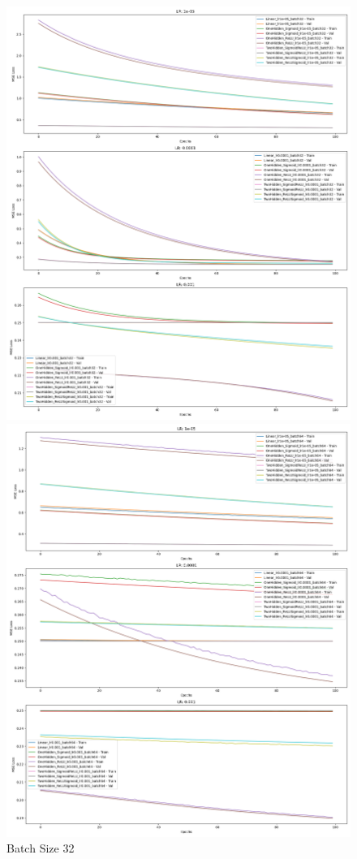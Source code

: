 \begin{figure}[!h]
    \centering
    \begin{minipage}{0.32\linewidth}
        \includegraphics[width=\linewidth]{mse_model_losses_batch32.png}
        \caption{Batch Size 32}
    \end{minipage}
    \hfill
    \begin{minipage}{0.32\linewidth}
        \includegraphics[width=\linewidth]{mse_model_losses_batch64.png}

\end{minipage}
\end{figure}
